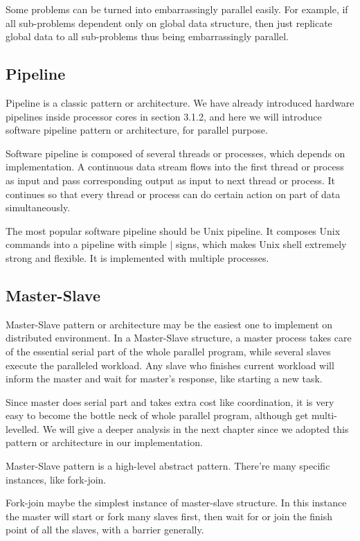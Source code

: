 \documentclass[12pt,a4]{report}
\begin{document}
Some problems can be turned into embarrassingly parallel easily. For example, if all sub-problems dependent only on global data structure, then just replicate global data to all sub-problems thus being embarrassingly parallel.

\subsection{Pipeline}

Pipeline is a classic pattern or architecture. We have already introduced hardware pipelines inside processor cores in section 3.1.2, and here we will introduce software pipeline pattern or architecture, for parallel purpose.

Software pipeline is composed of several threads or processes, which depends on implementation. A continuous data stream flows into the first thread or process as input and pass corresponding output as input to next thread or process. It continues so that every thread or process can do certain action on part of data simultaneously.

The most popular software pipeline should be Unix pipeline. It composes Unix commands into a pipeline with simple $\mid$ signs, which makes Unix shell extremely strong and flexible. It is implemented with multiple processes.

\subsection{Master-Slave}

Master-Slave pattern or architecture may be the easiest one to implement on distributed environment. In a Master-Slave structure, a master process takes care of the essential serial part of the whole parallel program, while several slaves execute the paralleled workload. Any slave who finishes current workload will inform the master and wait for master's response, like starting a new task.

Since master does serial part and takes extra cost like coordination, it is very easy to become the bottle neck of whole parallel program, although get multi-levelled. We will give a deeper analysis in the next chapter since we adopted this pattern or architecture in our implementation.

Master-Slave pattern is a high-level abstract pattern. There're many specific instances, like fork-join. 

Fork-join maybe the simplest instance of master-slave structure. In this instance the master will start or fork many slaves first, then wait for or join the finish point of all the slaves, with a barrier generally.
\end{document}
